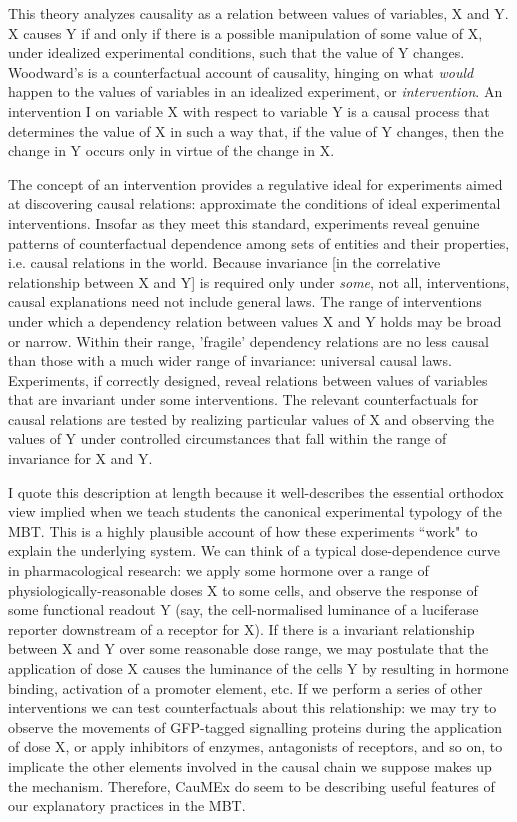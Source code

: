 \begin{longquote}
This theory analyzes causality as a relation between values of variables, X and Y. X causes Y if and only if there is a possible
manipulation of some value of X, under idealized experimental conditions, such that the value of Y changes. Woodward's is a counterfactual
account of causality, hinging on what \textit{would} happen to the values of
variables in an idealized experiment, or \textit{intervention}. An intervention I
on variable X with respect to variable Y is a causal process that determines the value of X in such a way that, if the value of Y changes, then
the change in Y occurs only in virtue of the change in X.

The concept of an intervention provides a regulative ideal for experiments aimed at discovering causal relations: approximate the conditions
of ideal experimental interventions. Insofar as they meet this standard,
experiments reveal genuine patterns of counterfactual dependence
among sets of entities and their properties, i.e. causal relations in the
world. Because invariance [in the correlative relationship between X and Y] is required only under \textit{some}, not all, interventions, causal explanations need not include general laws. The range
of interventions under which a dependency relation between values X
and Y holds may be broad or narrow. Within their range, 'fragile' dependency relations are no less causal than those with a much wider range of
invariance: universal causal laws. Experiments, if correctly designed,
reveal relations between values of variables that are invariant under
some interventions. The relevant counterfactuals for causal relations are
tested by realizing particular values of X and observing the values of Y
under controlled circumstances that fall within the range of invariance
for X and Y.
\cite[p.99]{Fagan2013}
\end{longquote}

I quote this description at length because it well-describes the essential orthodox view implied when we teach students the canonical experimental typology of the MBT. This is a highly plausible account of how these experiments ``work" to explain the underlying system. We can think of a typical dose-dependence curve in pharmacological research: we apply some hormone over a range of physiologically-reasonable doses X to some cells, and observe the response of some functional readout Y (say, the cell-normalised luminance of a luciferase reporter downstream of a receptor for X). If there is a invariant relationship between X and Y over some reasonable dose range, we may postulate that the application of dose X causes the luminance of the cells Y by resulting in hormone binding, activation of a promoter element, etc. If we perform a series of other interventions we can test counterfactuals about this relationship: we may try to observe the movements of GFP-tagged signalling proteins during the application of dose X, or apply inhibitors of enzymes, antagonists of receptors, and so on, to implicate the other elements involved in the causal chain we suppose makes up the mechanism. Therefore, CauMEx do seem to be describing useful features of our explanatory practices in the MBT.

